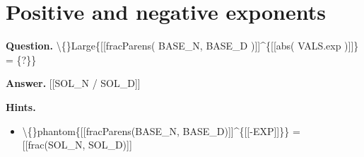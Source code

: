 \documentclass{article}
\begin{document}
\section*{Positive and negative exponents}
\textbf{Question.} \textbackslash\{\}Large\{[[fracParens( BASE\_N, BASE\_D )]]\textasciicircum{}\{[[abs( VALS.exp )]]\} = \{?\}\}

\textbf{Answer.} [[SOL\_N / SOL\_D]]

\textbf{Hints.}
\begin{itemize}
  \item \textbackslash\{\}phantom\{[[fracParens(BASE\_N, BASE\_D)]]\textasciicircum{}\{[[-EXP]]\}\} = [[frac(SOL\_N, SOL\_D)]]
\end{itemize}
\end{document}
